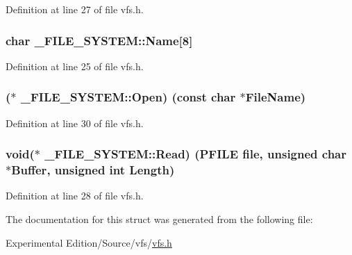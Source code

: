 Definition at line 27 of file vfs.\+h.

\subsubsection[{\texorpdfstring{Name}{Name}}]{\setlength{\rightskip}{0pt plus 5cm}char \+\_\+\+F\+I\+L\+E\+\_\+\+S\+Y\+S\+T\+E\+M\+::\+Name\mbox{[}8\mbox{]}}\hypertarget{struct__FILE__SYSTEM_a802d31f742c14deb2020c8bd6bcb4fdb}{}\label{struct__FILE__SYSTEM_a802d31f742c14deb2020c8bd6bcb4fdb}


Definition at line 25 of file vfs.\+h.

\subsubsection[{\texorpdfstring{Open}{Open}}]{($\ast$ \+\_\+\+F\+I\+L\+E\+\_\+\+S\+Y\+S\+T\+E\+M\+::\+Open) (const char $\ast$File\+Name)}\hypertarget{struct__FILE__SYSTEM_ae7183a7cfc938bbf1ed51aab2462b991}{}\label{struct__FILE__SYSTEM_ae7183a7cfc938bbf1ed51aab2462b991}


Definition at line 30 of file vfs.\+h.

\subsubsection[{\texorpdfstring{Read}{Read}}]{\setlength{\rightskip}{0pt plus 5cm}void($\ast$ \+\_\+\+F\+I\+L\+E\+\_\+\+S\+Y\+S\+T\+E\+M\+::\+Read) ({\bf P\+F\+I\+LE} {\bf file}, unsigned char $\ast$Buffer, unsigned int Length)}\hypertarget{struct__FILE__SYSTEM_a24dcbcc9b82e7395aa6b15ef3e36413c}{}\label{struct__FILE__SYSTEM_a24dcbcc9b82e7395aa6b15ef3e36413c}


Definition at line 28 of file vfs.\+h.



The documentation for this struct was generated from the following file\+:\begin{DoxyCompactItemize}
\item 
Experimental Edition/\+Source/vfs/\hyperlink{vfs_8h}{vfs.\+h}\end{DoxyCompactItemize}
